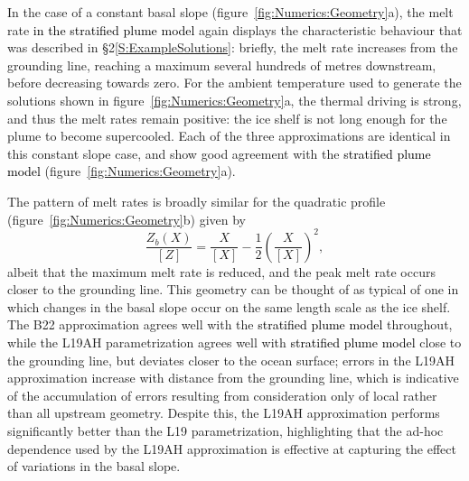 \documentclass[openacc]{rsproca_new}%
\newcommand{\red}[1]{{\color{red} #1}}
\newcommand{\blue}[1]{{\color{blue} #1}}
\newcommand{\rout}[1]{\red{\st{#1}}}\newcommand{\ab}[1]{\textcolor{Green}{#1}}\newcommand{\about}[1]{\textcolor{Cyan}{\sout{#1}}}
\renewcommand{\rout}[1]{{}} %
\renewcommand{\blue}[1]{{\textcolor{black}{#1}}} %
\renewcommand{\red}[1]{{}} %
\begin{document}
In the case of a constant basal slope (figure~\ref{fig:Numerics:Geometry}a), the melt rate \blue{in the stratified plume model} again displays the characteristic \rout{subglacial plume} behaviour that was described in \S2\ref{S:ExampleSolutions}: briefly, the melt rate increases from the grounding line, reaching a maximum several hundreds of metres downstream, before decreasing towards zero. For the ambient temperature used to generate the solutions shown in figure~\ref{fig:Numerics:Geometry}a, the thermal driving is strong, and thus the melt rates remain positive: the ice shelf is not long enough for the plume to become supercooled. Each of the three approximations are identical in this constant slope case, and show good agreement with the \rout{numerical solution }\blue{stratified plume model} (figure~\ref{fig:Numerics:Geometry}a).

The pattern of melt rates is broadly similar for the quadratic profile (figure~\ref{fig:Numerics:Geometry}b) given by
\begin{equation}\label{E:Numerics:QuadraticGeometry}
\frac{Z_b(X)}{\left[Z\right]}= \frac{X}{\left[X\right]} - \frac{1}{2}\left(\frac{X}{\left[X\right]}\right)^2,
\end{equation}
albeit that the maximum melt rate is reduced, and the peak melt rate occurs closer to the grounding line. This geometry can be thought of as typical of one in which changes in the basal slope occur on the same length scale as the ice shelf. The B22 approximation agrees well with the\rout{ numerical solution} \blue{stratified plume model} throughout, while the L19AH parametrization agrees well with\rout{ numerical solutions} \blue{stratified plume model} close to the grounding line, but deviates closer to the ocean surface; errors in the L19AH approximation increase with distance from the grounding line, which is indicative of the accumulation of errors resulting from consideration only of local rather than all upstream geometry. Despite this, the L19AH approximation performs significantly better than the L19 parametrization, highlighting that the ad-hoc dependence used by the L19AH approximation is effective at capturing the effect of variations in the basal slope.
\end{document}
